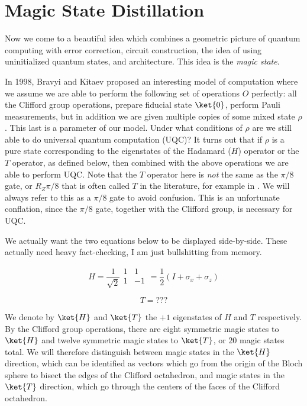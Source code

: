 \section{Magic State Distillation}

Now we come to a beautiful idea which combines a geometric picture of
quantum computing with error correction, circuit construction, the idea of
using uninitialized quantum states, and architecture.
This idea is the \emph{magic state}.

In 1998, Bravyi and Kitaev proposed an interesting model of computation where
we assume we are able to perform the following set of operations $O$
perfectly: all the Clifford group operations,
prepare fiducial state $\ket{0}$, perform Pauli measurements, but in
addition we are given multiple copies of some mixed state $\rho$. This last
is a parameter of our model. Under what conditions of $\rho$ are we still
able to do universal quantum computation (\textsc{UQC})? It turns out that
if $\rho$ is a pure state corresponding to the eigenstates of the Hadamard
($H$) operator or the $T$ operator, as defined below, then combined with the
above operations we are able to perform \textsc{UQC}. Note that the
$T$ operator here is \emph{not} the same as the $\pi/8$ gate, or $R_Z{\pi/8}$ that is
often called $T$ in the literature, for example in \cite{Nielsen2000}.
We will always refer to this as a $\pi/8$ gate to avoid confusion.
This is an unfortunate conflation, since the $\pi/8$ gate, together with the
Clifford group, is necessary for \textsc{UQC}.

We actually want the two equations below to be displayed side-by-side.
These actually need heavy fact-checking, I am just bullshitting from
memory.

\begin{displaymath}
H = \frac{1}{\sqrt{2}} \begin{array}{cc}
1 & 1 \\
1 & -1 \\
\end{array} = \frac{1}{2}(I + \sigma_x + \sigma_z)
\end{displaymath}

\begin{displaymath}
T = ???
\end{displaymath}

We denote by $\ket{H}$ and $\ket{T}$ the $+1$ eigenstates of $H$ and $T$
respectively. By the Clifford group operations, there are eight symmetric
magic states to $\ket{H}$ and twelve symmetric magic states to $\ket{T}$,
or $20$ magic states total. We will therefore distinguish between
magic states in the $\ket{H}$ direction, which can be identified as vectors
which go from the origin of the Bloch sphere to bisect the edges of the
Clifford octahedron, and magic states in the $\ket{T}$ direction, which
go through the centers of the faces of the Clifford octahedron.

